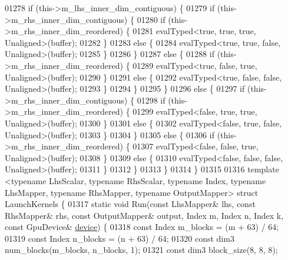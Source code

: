 \begin{DoxyCode}
01278     \textcolor{keywordflow}{if} (this->m\_lhs\_inner\_dim\_contiguous) \{
01279       \textcolor{keywordflow}{if} (this->m\_rhs\_inner\_dim\_contiguous) \{
01280         \textcolor{keywordflow}{if} (this->m\_rhs\_inner\_dim\_reordered) \{
01281           evalTyped<true, true, true, Unaligned>(buffer);
01282         \}
01283         \textcolor{keywordflow}{else} \{
01284           evalTyped<true, true, false, Unaligned>(buffer);
01285         \}
01286       \}
01287       \textcolor{keywordflow}{else} \{
01288        \textcolor{keywordflow}{if} (this->m\_rhs\_inner\_dim\_reordered) \{
01289           evalTyped<true, false, true, Unaligned>(buffer);
01290         \}
01291         \textcolor{keywordflow}{else} \{
01292           evalTyped<true, false, false, Unaligned>(buffer);
01293         \}
01294       \}
01295     \}
01296     \textcolor{keywordflow}{else} \{
01297       \textcolor{keywordflow}{if} (this->m\_rhs\_inner\_dim\_contiguous) \{
01298         \textcolor{keywordflow}{if} (this->m\_rhs\_inner\_dim\_reordered) \{
01299           evalTyped<false, true, true, Unaligned>(buffer);
01300         \}
01301         \textcolor{keywordflow}{else} \{
01302           evalTyped<false, true, false, Unaligned>(buffer);
01303         \}
01304       \}
01305       \textcolor{keywordflow}{else} \{
01306        \textcolor{keywordflow}{if} (this->m\_rhs\_inner\_dim\_reordered) \{
01307           evalTyped<false, false, true, Unaligned>(buffer);
01308         \}
01309         \textcolor{keywordflow}{else} \{
01310           evalTyped<false, false, false, Unaligned>(buffer);
01311         \}
01312       \}
01313     \}
01314   \}
01315 
01316   \textcolor{keyword}{template} <\textcolor{keyword}{typename} LhsScalar, \textcolor{keyword}{typename} RhsScalar, \textcolor{keyword}{typename} Index, \textcolor{keyword}{typename} LhsMapper, \textcolor{keyword}{typename} RhsMapper,
       \textcolor{keyword}{typename} OutputMapper> \textcolor{keyword}{struct }LaunchKernels \{
01317     \textcolor{keyword}{static} \textcolor{keywordtype}{void} Run(\textcolor{keyword}{const} LhsMapper& lhs, \textcolor{keyword}{const} RhsMapper& rhs, \textcolor{keyword}{const} OutputMapper& output, Index m, Index 
      n, Index k, \textcolor{keyword}{const} GpuDevice& \hyperlink{struct_eigen_1_1_tensor_evaluator_a98b51809ed8f7a1f736eb7b952b9636e}{device}) \{
01318     \textcolor{keyword}{const} Index m\_blocks = (m + 63) / 64;
01319     \textcolor{keyword}{const} Index n\_blocks = (n + 63) / 64;
01320     \textcolor{keyword}{const} dim3 num\_blocks(m\_blocks, n\_blocks, 1);
01321     \textcolor{keyword}{const} dim3 block\_size(8, 8, 8);

\end{DoxyCode}
